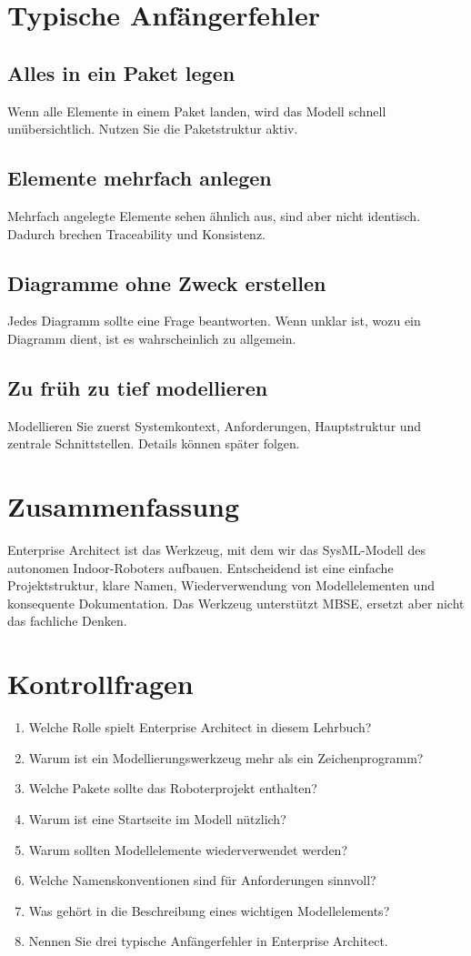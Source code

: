 \section{Typische Anfängerfehler}
\subsection{Alles in ein Paket legen}
Wenn alle Elemente in einem Paket landen, wird das Modell schnell unübersichtlich. Nutzen Sie die Paketstruktur aktiv.

\subsection{Elemente mehrfach anlegen}
Mehrfach angelegte Elemente sehen ähnlich aus, sind aber nicht identisch. Dadurch brechen Traceability und Konsistenz.

\subsection{Diagramme ohne Zweck erstellen}
Jedes Diagramm sollte eine Frage beantworten. Wenn unklar ist, wozu ein Diagramm dient, ist es wahrscheinlich zu allgemein.

\subsection{Zu früh zu tief modellieren}
Modellieren Sie zuerst Systemkontext, Anforderungen, Hauptstruktur und zentrale Schnittstellen. Details können später folgen.

\section{Zusammenfassung}
Enterprise Architect ist das Werkzeug, mit dem wir das SysML-Modell des autonomen Indoor-Roboters aufbauen. Entscheidend ist eine einfache Projektstruktur, klare Namen, Wiederverwendung von Modellelementen und konsequente Dokumentation. Das Werkzeug unterstützt MBSE, ersetzt aber nicht das fachliche Denken.

\section{Kontrollfragen}
\begin{enumerate}
    \item Welche Rolle spielt Enterprise Architect in diesem Lehrbuch?
    \item Warum ist ein Modellierungswerkzeug mehr als ein Zeichenprogramm?
    \item Welche Pakete sollte das Roboterprojekt enthalten?
    \item Warum ist eine Startseite im Modell nützlich?
    \item Warum sollten Modellelemente wiederverwendet werden?
    \item Welche Namenskonventionen sind für Anforderungen sinnvoll?
    \item Was gehört in die Beschreibung eines wichtigen Modellelements?
    \item Nennen Sie drei typische Anfängerfehler in Enterprise Architect.
\end{enumerate}

